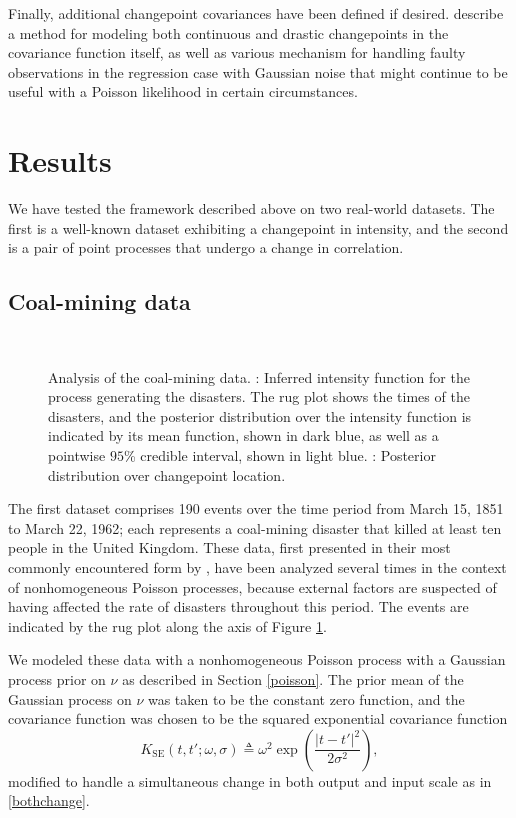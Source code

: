 \documentclass{article}
\newcommand{\deq}{\triangleq}
\newcommand{\psff}[1]{\texttt{[image: figures/\#1.eps]}}
\begin{document}
Finally, additional changepoint covariances have been defined if
desired.  \citet{cpcj} describe a method for modeling both continuous
and drastic changepoints in the covariance function itself, as well as
various mechanism for handling faulty observations in the regression
case with Gaussian noise that might continue to be useful with a
Poisson likelihood in certain circumstances.

\section{Results}
\label{results}

We have tested the framework described above on two real-world
datasets.  The first is a well-known dataset exhibiting a changepoint
in intensity, and the second is a pair of point processes that undergo
a change in correlation.

\subsection{Coal-mining data}

\begin{figure}
  \centering
  \subfloat[][]{
    \psff{posterior}
    \label{posterior}
  }
  \\
  \subfloat[][]{
    \psff{changepoint}
    \label{changepoint}
  }
  \caption{Analysis of the coal-mining data.  :
    Inferred intensity function for the process generating the
    disasters.  The rug plot shows the times of the disasters, and the
    posterior distribution over the intensity function is indicated by
    its mean function, shown in dark blue, as well as a pointwise
    $95$\% credible interval, shown in light blue.
    : Posterior distribution over changepoint
    location.  }
  \label{coal}
\end{figure}

The first dataset comprises 190 events over the time period from March
15, 1851 to March 22, 1962; each represents a coal-mining disaster
that killed at least ten people in the United Kingdom.  These data,
first presented in their most commonly encountered form by
\citet{jarrett}, have been analyzed several times in the context of
nonhomogeneous Poisson processes, because external factors are
suspected of having affected the rate of disasters throughout this
period.  The events are indicated by the rug plot along the axis of
Figure \ref{coal}.

We modeled these data with a nonhomogeneous Poisson process with a
Gaussian process prior on $\nu$ as described in Section \ref{poisson}.
The prior mean of the Gaussian process on $\nu$ was taken to be the
constant zero function, and the covariance function was chosen to be
the squared exponential covariance function
\begin{equation}
  \label{sqdexp}
  K_{\text{SE}}(t, t'; \omega, \sigma)
  \deq
  \omega^2
  \exp
  \left(
  \frac{ \lvert t - t' \rvert^2}{2\sigma^2}
  \right),
\end{equation}
modified to handle a simultaneous change in both output and input
scale as in \eqref{bothchange}.
\end{document}
